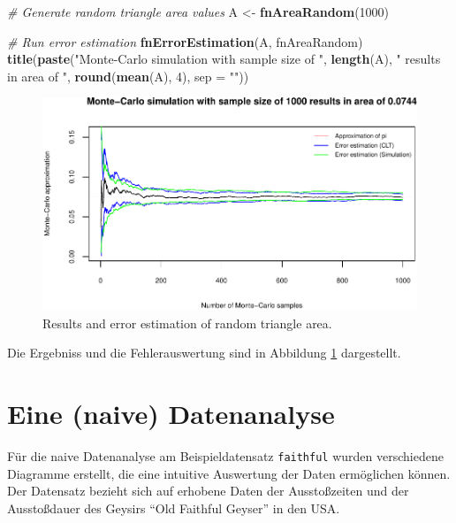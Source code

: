 \documentclass[10pt,]{article}
\newenvironment{Shaded}{\begin{snugshade}}{\end{snugshade}}
\newcommand{\KeywordTok}[1]{\textcolor[rgb]{0.13,0.29,0.53}{\textbf{{#1}}}}
\newcommand{\DataTypeTok}[1]{\textcolor[rgb]{0.13,0.29,0.53}{{#1}}}
\newcommand{\DecValTok}[1]{\textcolor[rgb]{0.00,0.00,0.81}{{#1}}}
\newcommand{\StringTok}[1]{\textcolor[rgb]{0.31,0.60,0.02}{{#1}}}
\newcommand{\CommentTok}[1]{\textcolor[rgb]{0.56,0.35,0.01}{\textit{{#1}}}}
\newcommand{\NormalTok}[1]{{#1}}
\begin{document}
\begin{Shaded}
\begin{Highlighting}[]
\CommentTok{# Generate random triangle area values}
\NormalTok{A <-}\StringTok{ }\KeywordTok{fnAreaRandom}\NormalTok{(}\DecValTok{1000}\NormalTok{)}

\CommentTok{# Run error estimation}
\KeywordTok{fnErrorEstimation}\NormalTok{(A, fnAreaRandom)}
\KeywordTok{title}\NormalTok{(}\KeywordTok{paste}\NormalTok{(}\StringTok{"Monte-Carlo simulation with sample size of "}\NormalTok{, }\KeywordTok{length}\NormalTok{(A),}
            \StringTok{" results in area of "}\NormalTok{, }\KeywordTok{round}\NormalTok{(}\KeywordTok{mean}\NormalTok{(A), }\DecValTok{4}\NormalTok{), }\DataTypeTok{sep =} \StringTok{""}\NormalTok{))}
\end{Highlighting}
\end{Shaded}

\begin{figure}[htbp]
\centering
\includegraphics{project1_files/figure-latex/triangle monte-carlo-1.pdf}
\caption{Results and error estimation of random triangle
area.\label{fig:plotTri}}
\end{figure}

Die Ergebniss und die Fehlerauswertung sind in Abbildung
\ref{fig:plotTri} dargestellt.

\newpage

\section{Eine (naive) Datenanalyse}\label{eine-naive-datenanalyse}

Für die naive Datenanalyse am Beispieldatensatz \texttt{faithful} wurden
verschiedene Diagramme erstellt, die eine intuitive Auswertung der Daten
ermöglichen können. Der Datensatz bezieht sich auf erhobene Daten der
Ausstoßzeiten und der Ausstoßdauer des Geysirs ``Old Faithful Geyser''
in den USA.
\end{document}

